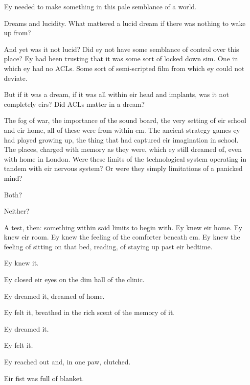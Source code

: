 Ey needed to make something in this pale semblance of a world.

Dreams and lucidity. What mattered a lucid dream if there was nothing to wake up from?

And yet was it not lucid? Did ey not have some semblance of control over this place? Ey had been trusting that it was some sort of locked down sim. One in which ey had no ACLs. Some sort of semi-scripted film from which ey could not deviate.

But if it was a dream, if it was all within eir head and implants, was it not completely eirs? Did ACLs matter in a dream?

The fog of war, the importance of the sound board, the very setting of eir school and eir home, all of these were from within em. The ancient strategy games ey had played growing up, the thing that had captured eir imagination in school. The places, charged with memory as they were, which ey still dreamed of, even with home in London. Were these limits of the technological system operating in tandem with eir nervous system? Or were they simply limitations of a panicked mind?

Both?

Neither?

A test, then: something within said limits to begin with. Ey knew eir home. Ey knew eir room. Ey knew the feeling of the comforter beneath em. Ey knew the feeling of sitting on that bed, reading, of staying up past eir bedtime.

Ey knew it.

Ey closed eir eyes on the dim hall of the clinic.

Ey dreamed it, dreamed of home.

Ey felt it, breathed in the rich scent of the memory of it.

Ey dreamed it.

Ey felt it.

Ey reached out and, in one paw, clutched.

Eir fist was full of blanket.
